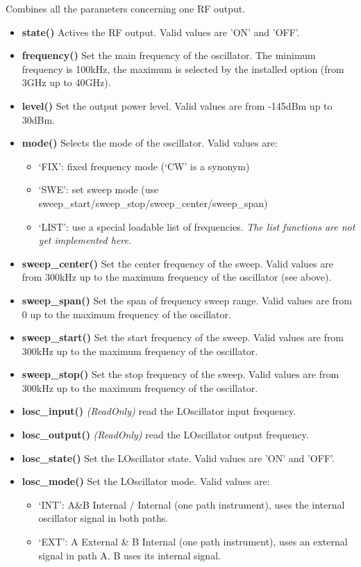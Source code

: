 \documentclass[11pt]{article} %
\begin{document}
Combines all the parameters concerning one RF output.
\begin{itemize}
\item {\bf state()} Actives the RF output. Valid values are 'ON' and 'OFF'.
\item {\bf frequency()} Set the main frequency of the oscillator. The minimum frequency is 100kHz, the maximum is selected by the installed option (from 3GHz up to 40GHz).
\item {\bf level()} Set the output power level. Valid values are from -145dBm up to 30dBm.
\item {\bf mode()} Selects the mode of the oscillator. Valid values are:
	\begin{itemize}[]
	\item `FIX': fixed frequency mode (`CW' is a synonym)
	\item `SWE': set sweep mode (use sweep\_start/sweep\_stop/sweep\_center/sweep\_span)
	\item `LIST': use a special loadable list of frequencies. {\it The list functions are not yet implemented here.}
	\end{itemize}
\item {\bf sweep\_center()} Set the center frequency of the sweep. Valid values are from 300kHz up to the maximum frequency of the oscillator (see above).
\item {\bf sweep\_span()} Set the span of frequency sweep range. Valid values are from 0 up to the maximum frequency of the oscillator.
\item {\bf sweep\_start()} Set the start frequency of the sweep. Valid values are from 300kHz up to the maximum frequency of the oscillator.
\item {\bf sweep\_stop()} Set the stop frequency of the sweep. Valid values are from 300kHz up to the maximum frequency of the oscillator.
\item {\bf losc\_input()} {\it (ReadOnly)} read the LOscillator input frequency.
\item {\bf losc\_output()} {\it (ReadOnly)} read the LOscillator output frequency.
\item {\bf losc\_state()} Set the LOscillator state. Valid values are 'ON' and 'OFF'.
\item {\bf losc\_mode()} Set the LOscillator mode. Valid values are:
	\begin{itemize}[]
	\item `INT': A\&B Internal / Internal (one path instrument), uses the internal oscillator signal in both paths.
	\item `EXT': A External \& B Internal (one path instrument), uses an external signal in path A. B uses its internal signal.

\end{itemize}
\end{itemize}
\end{document}
